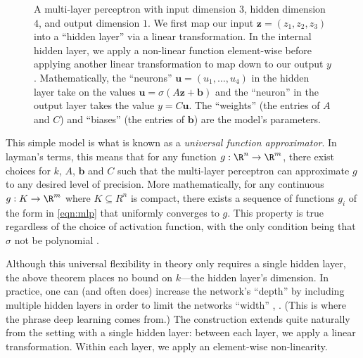 \begin{figure}[h]
	\centering

	\caption{A multi-layer perceptron with input dimension $3$, hidden dimension $4$, and output dimension $1$. We first map our input $\mathbf z = (z_1, z_2, z_3)$ into a ``hidden layer'' via a linear transformation. In the internal hidden layer, we apply a non-linear function element-wise before applying another linear transformation to map down to our output $y$. Mathematically, the ``neurons'' $\mathbf u = (u_1, \ldots, u_4)$ in the hidden layer take on the values $\mathbf u = \sigma(A\mathbf z + \mathbf b)$ and the ``neuron'' in the output layer takes the value $y = C\mathbf u$. The ``weights'' (the entries of $A$ and $C$) and ``biases'' (the entries of $\mathbf b$) are the model's parameters.}
	\label{fig:mlp-diagram}
\end{figure}

This simple model is what is known as a \emph{universal function approximator}. In layman's terms, this means that for any function $g : \R^n \to \R^m$, there exist choices for $k$, $A$, $\mathbf b$ and $C$ such that the multi-layer perceptron can approximate $g$ to any desired level of precision. More mathematically, for any continuous $g : K \to \R^m$ where $K \subseteq R^n$ is compact, there exists a sequence of functions $g_i$ of the form in \autoref{eqn:mlp} that uniformly converges to $g$. This property is true regardless of the choice of activation function, with the only condition being that $\sigma$ not be polynomial \cite[\S 13.2.5]{PML}.

Although this universal flexibility in theory only requires a single hidden layer, the above theorem places no bound on $k$---the hidden layer's dimension. In practice, one can (and often does) increase the network's ``depth'' by including multiple hidden layers in order to limit the networks ``width'' \cite[\S 13.2.5]{PML}, \cite[10.2]{ISL}. (This is where the phrase deep learning comes from.) The construction extends quite naturally from the setting with a single hidden layer: between each layer, we apply a linear transformation. Within each layer, we apply an element-wise non-linearity.

